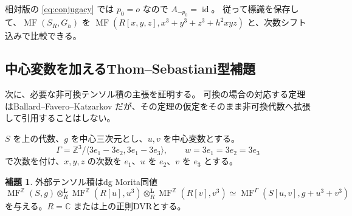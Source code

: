 \documentclass[a4paper,11pt]{ltjsarticle}
\theoremstyle{definition}
\newtheorem{lemma}[theorem]{補題}
\newcommand{\CC}{\mathbb C}
\newcommand{\id}{\operatorname{id}}
\newcommand{\MF}{\operatorname{MF}}
\begin{document}
相対版の \eqref{eq:conjugacy} では $p_0=o$ なので $A_{-p_0}=\id$。
従って標識を保存して、$\MF(S_R,G_h)$ を
$\MF(R[x,y,z],x^3+y^3+z^3+h^2xyz)$ と、次数シフト込みで比較できる。

\subsection{中心変数を加えるThom--Sebastiani型補題}

次に、必要な非可換テンソル積の主張を証明する。
可換の場合の対応する定理はBallard--Favero--Katzarkov\cite[Theorem 5.15, Corollary 5.18]{BFK}
だが、その定理の仮定をそのまま非可換代数へ拡張して引用することはしない。

$S$ を上の代数、$g$ を中心三次元とし、$u,v$ を中心変数とする。
\[
 \Gamma=\mathbb Z^3/\langle3e_1-3e_2,3e_1-3e_3\rangle,
 \qquad w=3e_1=3e_2=3e_3
\]
で次数を付け、$x,y,z$ の次数を $e_1$、$u$ を $e_2$、$v$ を $e_3$ とする。

\begin{lemma}\label{lem:ts}
外部テンソル積はdg Morita同値
\[
 \MF^{\mathbb Z}(S,g)\otimes_R^{\mathbf L}
 \MF^{\mathbb Z}(R[u],u^3)\otimes_R^{\mathbf L}
 \MF^{\mathbb Z}(R[v],v^3)
 \simeq\MF^\Gamma(S[u,v],g+u^3+v^3)
\]
を与える。$R=\CC$ または上の正則DVRとする。
\end{lemma}
\end{document}
